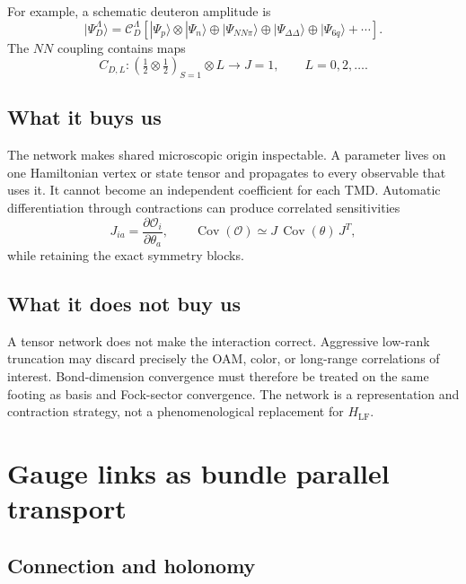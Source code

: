 \documentclass[11pt]{article}
\newcommand{\LF}{\mathrm{LF}}
\begin{document}
For example, a schematic deuteron amplitude is
\begin{equation}
|\Psi_D^\Lambda\rangle
=
\mathcal C_D^\Lambda\!
\left[
|\Psi_p\rangle\otimes|\Psi_n\rangle
\oplus|\Psi_{NN\pi}\rangle
\oplus|\Psi_{\Delta\Delta}\rangle
\oplus|\Psi_{6q}\rangle+\cdots
\right].
\label{eq:deuteron-network}
\end{equation}
The \(NN\) coupling contains maps
\begin{equation}
C_{D,L}:
\left(\tfrac12\otimes\tfrac12\right)_{S=1}
\otimes L
\longrightarrow J=1,
\qquad L=0,2,\ldots .
\label{eq:deuteron-intertwiner}
\end{equation}

\subsection{What it buys us}

The network makes shared microscopic origin inspectable.  A parameter lives
on one Hamiltonian vertex or state tensor and propagates to every observable
that uses it.  It cannot become an independent coefficient for each TMD.
Automatic differentiation through contractions can produce correlated
sensitivities
\begin{equation}
J_{ia}=\frac{\partial\mathcal O_i}{\partial\theta_a},
\qquad
\operatorname{Cov}(\mathcal O)
\simeq J\,\operatorname{Cov}(\theta)\,J^T,
\label{eq:network-covariance}
\end{equation}
while retaining the exact symmetry blocks.

\subsection{What it does not buy us}

A tensor network does not make the interaction correct.  Aggressive
low-rank truncation may discard precisely the OAM, color, or long-range
correlations of interest.  Bond-dimension convergence must therefore be
treated on the same footing as basis and Fock-sector convergence.  The
network is a representation and contraction strategy, not a phenomenological
replacement for \(H_{\LF}\).

\section{Gauge links as bundle parallel transport}

\subsection{Connection and holonomy}
\end{document}
